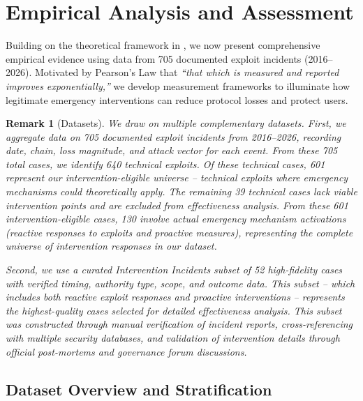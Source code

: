 \documentclass[12pt]{article}
\newif\ifconcise
\newtheorem{remark}{Remark}
\begin{document}
\section{Empirical Analysis and Assessment}
\label{sec:empirical}

Building on the theoretical framework in , we now present comprehensive empirical evidence using data from 705 documented exploit incidents (2016--2026). Motivated by Pearson's Law that \emph{``that which is measured and reported improves exponentially,''} we develop measurement frameworks to illuminate how legitimate emergency interventions can reduce protocol losses and protect users.

\ifconcise\else
\begin{remark}[Datasets]
We draw on multiple complementary datasets. First, we aggregate data on 705 documented exploit incidents from 2016--2026, recording date, chain, loss magnitude, and attack vector for each event. From these 705 total cases, we identify 640 technical exploits. Of these technical cases, 601 represent our intervention-eligible universe -- technical exploits where emergency mechanisms could theoretically apply. The remaining 39 technical cases lack viable intervention points and are excluded from effectiveness analysis. From these 601 intervention-eligible cases, 130 involve actual emergency mechanism activations (reactive responses to exploits and proactive measures), representing the complete universe of intervention responses in our dataset.

Second, we use a curated \emph{Intervention Incidents} subset of 52 high-fidelity cases with verified timing, authority type, scope, and outcome data. This subset -- which includes both reactive exploit responses and proactive interventions -- represents the highest-quality cases selected for detailed effectiveness analysis. This subset was constructed through manual verification of incident reports, cross-referencing with multiple security databases, and validation of intervention details through official post-mortems and governance forum discussions.
\end{remark}
\fi


\subsection{Dataset Overview and Stratification}
\label{subsec:stratification}
\end{document}
